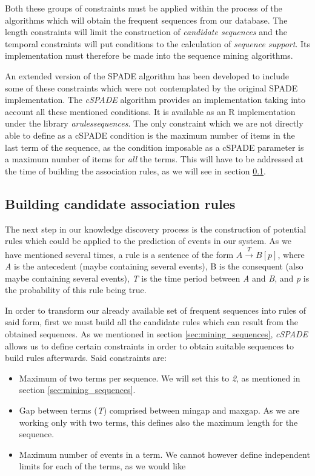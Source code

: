 \documentclass[a4paper,12pt]{article}
\begin{document}
Both these groups of constraints must be applied within the process of the algorithms which will obtain the frequent sequences from our database. The length constraints will limit the construction of \emph{candidate sequences} and the temporal constraints will put conditions to the calculation of \emph{sequence support}. Its implementation must therefore be made into the sequence mining algorithms.

An extended version of the SPADE algorithm has been developed to include some of these constraints which were not contemplated by the original SPADE implementation. The \emph{cSPADE} algorithm\cite{zaki2000cspade,wu2010sequential} provides an implementation taking into account all these mentioned conditions. It is available as an R implementation under the library \emph{arulessequences}\cite{hahsler2011arules}. The only constraint which we are not directly able to define as a cSPADE condition is the maximum number of items in the last term of the sequence, as the condition imposable as a cSPADE parameter is a maximum number of items for \emph{all} the terms. This will have to be addressed at the time of building the association rules, as we will see in section \ref{sec:assoc_rules}.

\subsection{Building candidate association rules} 
\label{sec:assoc_rules}
The next step in our knowledge discovery process is the construction of potential rules which could be applied to the prediction of events in our system. As we have mentioned several times, a rule is a sentence of the form ${A} \xrightarrow{T} {B} [p]$, where \emph{A} is the antecedent (maybe containing several events), B is the consequent (also maybe containing several events), \emph{T} is the time period between \emph{A} and \emph{B}, and \emph{p} is the probability of this rule being true.

In order to transform our already available set of frequent sequences into rules of said form, first we must build all the candidate rules which can result from the obtained sequences. As we mentioned in section \ref{sec:mining_sequences}, \emph{cSPADE} allows us to define certain constraints in order to obtain suitable sequences to build rules afterwards. Said constraints are:

\begin{itemize}
\item Maximum of two terms per sequence. We will set this to \emph{2}, as mentioned in section \ref{sec:mining_sequences}.
\item Gap between terms (\emph{T}) comprised between mingap and maxgap. As we are working only with two terms, this defines also the maximum length for the sequence.
\item Maximum number of events in a term. We cannot however define independent limits for each of the terms, as we would like
\end{itemize}
\end{document}
